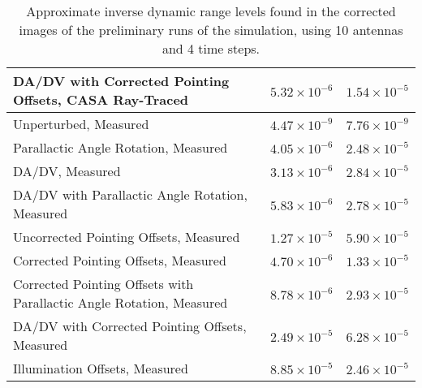 \documentclass[11pt]{article}
\begin{document}
\begin{table}
\begin{tabular}{|p{8cm}|c|c|}
    \hline
    DA/DV with Corrected Pointing Offsets, CASA Ray-Traced & $5.32 \times
    10^{-6}$ & $1.54 \times 10^{-5}$ \\
    \hline
    Unperturbed, Measured & $4.47 \times 10^{-9}$ & $7.76 \times
    10^{-9}$ \\
    \hline
    Parallactic Angle Rotation, Measured & $4.05 \times 10^{-6}$ &
    $2.48 \times 10^{-5}$\\
    \hline
    DA/DV, Measured & $3.13 \times 10^{-6}$ & $2.84 \times 10^{-5}$ \\
    \hline
    DA/DV with Parallactic Angle Rotation, Measured & $5.83 \times
    10^{-6}$ & $2.78 \times 10^{-5}$ \\
    \hline
    Uncorrected Pointing Offsets, Measured & $1.27 \times 10^{-5}$
    & $5.90 \times 10^{-5}$ \\
    \hline
    Corrected Pointing Offsets, Measured & $4.70 \times 10^{-6}$ &
    $1.33 \times 10^{-5}$\\
    \hline
    Corrected Pointing Offsets with Parallactic Angle Rotation, Measured & 
    $8.78 \times 10^{-6}$ & $2.93 \times 10^{-5}$ \\
    \hline
    DA/DV with Corrected Pointing Offsets, Measured & $2.49 \times
    10^{-5}$ & $6.28 \times 10^{-5}$ \\
    \hline
    Illumination Offsets, Measured & $8.85 \times
    10^{-5}$ & $2.46 \times 10^{-5}$ \\
    \hline
    \end{tabular}
    \caption{
        Approximate inverse dynamic range levels found in the corrected images 
        of the preliminary runs of the simulation, using 10 antennas and 4 time 
        steps.
    }
    \label{tab:rms-10ants}
\end{table}
\end{document}
